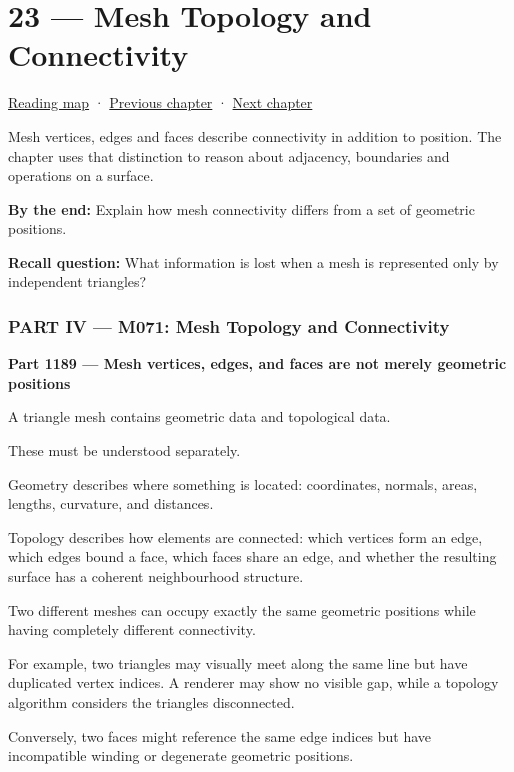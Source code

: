 \hypertarget{04-visual-computing-ii-ch023}{}
\chapter{23 --- Mesh Topology and Connectivity}\label{04-visual-computing-ii-ch023-mesh-topology-and-connectivity}

\hyperref[volume-reading-map]{Reading map} · \hyperref[04-visual-computing-ii-ch022]{Previous chapter} · \hyperref[04-visual-computing-ii-ch024]{Next chapter}

Mesh vertices, edges and faces describe connectivity in addition to position. The chapter uses that distinction to reason about adjacency, boundaries and operations on a surface.

\textbf{By the end:} Explain how mesh connectivity differs from a set of geometric positions.

\textbf{Recall question:} What information is lost when a mesh is represented only by independent triangles?

\subsection{PART IV --- M071: Mesh Topology and Connectivity}\label{04-visual-computing-ii-ch023-part-iv-m071-mesh-topology-and-connectivity}

\textbf{Part 1189 --- Mesh vertices, edges, and faces are not merely geometric positions}

A triangle mesh contains geometric data and topological data.

These must be understood separately.

Geometry describes where something is located: coordinates, normals, areas, lengths, curvature, and distances.

Topology describes how elements are connected: which vertices form an edge, which edges bound a face, which faces share an edge, and whether the resulting surface has a coherent neighbourhood structure.

Two different meshes can occupy exactly the same geometric positions while having completely different connectivity.

For example, two triangles may visually meet along the same line but have duplicated vertex indices. A renderer may show no visible gap, while a topology algorithm considers the triangles disconnected.

Conversely, two faces might reference the same edge indices but have incompatible winding or degenerate geometric positions.

